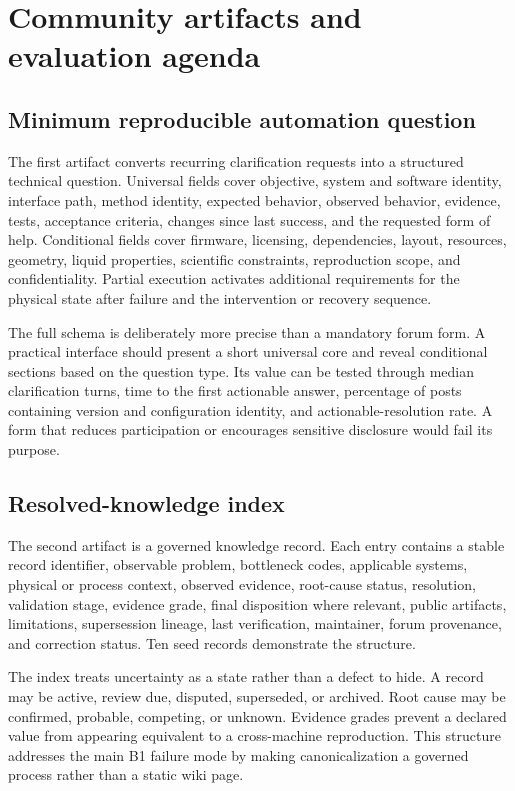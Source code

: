 \section{Community artifacts and evaluation agenda}
\label{sec:artifacts}

\subsection{Minimum reproducible automation question}

The first artifact converts recurring clarification requests into a structured technical question. Universal fields cover objective, system and software identity, interface path, method identity, expected behavior, observed behavior, evidence, tests, acceptance criteria, changes since last success, and the requested form of help. Conditional fields cover firmware, licensing, dependencies, layout, resources, geometry, liquid properties, scientific constraints, reproduction scope, and confidentiality. Partial execution activates additional requirements for the physical state after failure and the intervention or recovery sequence.

The full schema is deliberately more precise than a mandatory forum form. A practical interface should present a short universal core and reveal conditional sections based on the question type. Its value can be tested through median clarification turns, time to the first actionable answer, percentage of posts containing version and configuration identity, and actionable-resolution rate. A form that reduces participation or encourages sensitive disclosure would fail its purpose.

\subsection{Resolved-knowledge index}

The second artifact is a governed knowledge record. Each entry contains a stable record identifier, observable problem, bottleneck codes, applicable systems, physical or process context, observed evidence, root-cause status, resolution, validation stage, evidence grade, final disposition where relevant, public artifacts, limitations, supersession lineage, last verification, maintainer, forum provenance, and correction status. Ten seed records demonstrate the structure.

The index treats uncertainty as a state rather than a defect to hide. A record may be active, review due, disputed, superseded, or archived. Root cause may be confirmed, probable, competing, or unknown. Evidence grades prevent a declared value from appearing equivalent to a cross-machine reproduction. This structure addresses the main B1 failure mode by making canonicalization a governed process rather than a static wiki page.

